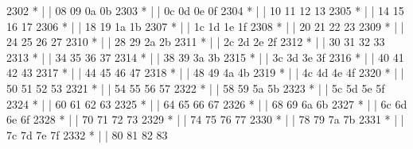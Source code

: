 \begin{DoxyCode}
2302 \textcolor{comment}{         * |    |                           08  09  0a  0b}
2303 \textcolor{comment}{         * |    |                           0c  0d  0e  0f}
2304 \textcolor{comment}{         * |    |                           10  11  12  13}
2305 \textcolor{comment}{         * |    |                           14  15  16  17}
2306 \textcolor{comment}{         * |    |                           18  19  1a  1b}
2307 \textcolor{comment}{         * |    |                           1c  1d  1e  1f}
2308 \textcolor{comment}{         * |    |                           20  21  22  23}
2309 \textcolor{comment}{         * |    |                           24  25  26  27}
2310 \textcolor{comment}{         * |    |                           28  29  2a  2b}
2311 \textcolor{comment}{         * |    |                           2c  2d  2e  2f}
2312 \textcolor{comment}{         * |    |                           30  31  32  33}
2313 \textcolor{comment}{         * |    |                           34  35  36  37}
2314 \textcolor{comment}{         * |    |                           38  39  3a  3b}
2315 \textcolor{comment}{         * |    |                           3c  3d  3e  3f}
2316 \textcolor{comment}{         * |    |                           40  41  42  43}
2317 \textcolor{comment}{         * |    |                           44  45  46  47}
2318 \textcolor{comment}{         * |    |                           48  49  4a  4b}
2319 \textcolor{comment}{         * |    |                           4c  4d  4e  4f}
2320 \textcolor{comment}{         * |    |                           50  51  52  53}
2321 \textcolor{comment}{         * |    |                           54  55  56  57}
2322 \textcolor{comment}{         * |    |                           58  59  5a  5b}
2323 \textcolor{comment}{         * |    |                           5c  5d  5e  5f}
2324 \textcolor{comment}{         * |    |                           60  61  62  63}
2325 \textcolor{comment}{         * |    |                           64  65  66  67}
2326 \textcolor{comment}{         * |    |                           68  69  6a  6b}
2327 \textcolor{comment}{         * |    |                           6c  6d  6e  6f}
2328 \textcolor{comment}{         * |    |                           70  71  72  73}
2329 \textcolor{comment}{         * |    |                           74  75  76  77}
2330 \textcolor{comment}{         * |    |                           78  79  7a  7b}
2331 \textcolor{comment}{         * |    |                           7c  7d  7e  7f}
2332 \textcolor{comment}{         * |    |                           80  81  82  83}

\end{DoxyCode}
